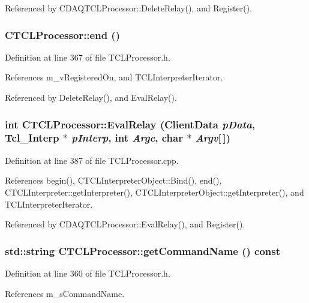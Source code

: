 Referenced by CDAQTCLProcessor::Delete\-Relay(), and Register().
\subsubsection{ CTCLProcessor::end ()\hspace{0.3cm}{\tt  [inline]}}\label{classCTCLProcessor_a6}




Definition at line 367 of file TCLProcessor.h.

References m\_\-v\-Registered\-On, and TCLInterpreter\-Iterator.

Referenced by Delete\-Relay(), and Eval\-Relay().
\subsubsection{\setlength{\rightskip}{0pt plus 5cm}int CTCLProcessor::Eval\-Relay (Client\-Data {\em p\-Data}, Tcl\_\-Interp $\ast$ {\em p\-Interp}, int {\em Argc}, char $\ast$ {\em Argv}[$\,$])\hspace{0.3cm}{\tt  [static]}}\label{classCTCLProcessor_d1}




Definition at line 387 of file TCLProcessor.cpp.

References begin(), CTCLInterpreter\-Object::Bind(), end(), CTCLInterpreter::get\-Interpreter(), CTCLInterpreter\-Object::get\-Interpreter(), and TCLInterpreter\-Iterator.

Referenced by CDAQTCLProcessor::Eval\-Relay(), and Register().
\subsubsection{\setlength{\rightskip}{0pt plus 5cm}std::string CTCLProcessor::get\-Command\-Name () const\hspace{0.3cm}{\tt  [inline]}}\label{classCTCLProcessor_a4}




Definition at line 360 of file TCLProcessor.h.

References m\_\-s\-Command\-Name.

